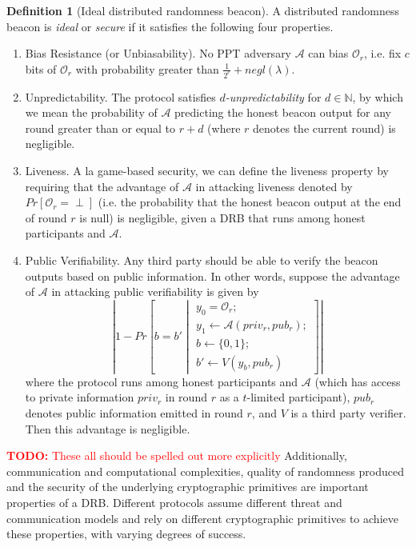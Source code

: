 \documentclass[letterpaper,twocolumn,10pt]{article}
\theoremstyle{definition}
\newtheorem{definition}[theorem]{Definition}
\theoremstyle{remark}
\newcommand{\todo}[1]{\textcolor{red}{\textbf{TODO:} #1}}
\begin{document}
\begin{definition}[Ideal distributed randomness beacon]
A distributed randomness beacon is \textit{ideal} or \textit{secure} if it satisfies the following four properties.
\begin{enumerate}
\item Bias Resistance (or Unbiasability). No PPT adversary $\mathcal{A}$ can bias $\mathcal{O}_r$, i.e. fix $c$ bits of $\mathcal{O}_r$ with probability greater than $\frac{1}{2^c} + negl(\lambda)$.
\item Unpredictability. The protocol satisfies \textit{$d$-unpredictability} for $d \in \mathbb{N}$, by which we mean the probability of $\mathcal{A}$ predicting the honest beacon output for any round greater than or equal to $r + d$ (where $r$ denotes the current round) is negligible.
\item Liveness. A la game-based security, we can define the liveness property by requiring that the advantage of $\mathcal{A}$ in attacking liveness denoted by $Pr[\mathcal{O}_r = \text{$\perp$}]$ (i.e. the probability that the honest beacon output at the end of round $r$ is null) is negligible, given a DRB that runs among honest participants and $\mathcal{A}$.
\item Public Verifiability. Any third party should be able to verify the beacon outputs based on public information. In other words, suppose the advantage of $\mathcal{A}$ in attacking public verifiability is given by
\[
\left\lvert 1 - Pr\left[b = b' \middle\vert \begin{array}{l}
y_0 = \mathcal{O}_r;\\
y_1 \leftarrow \mathcal{A}(priv_r, pub_r);\\
b \leftarrow \{0, 1\};\\
b' \leftarrow V(y_b, pub_r)
\end{array}\right]
\right\rvert
\]
where the protocol runs among honest participants and $\mathcal{A}$ (which has access to private information $priv_r$ in round $r$ as a $t$-limited participant), $pub_r$ denotes public information emitted in round $r$, and $V$ is a third party verifier. Then this advantage is negligible.
\end{enumerate}
\end{definition}

\todo{These all should be spelled out more explicitly}
Additionally, communication and computational complexities, quality of randomness produced and the security of the underlying cryptographic primitives are important properties of a DRB. Different protocols assume different threat and communication models and rely on different cryptographic primitives to achieve these properties, with varying degrees of success. 
\end{document}
